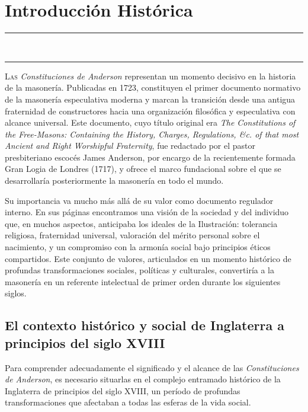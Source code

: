 \documentclass[a4paper,12pt,twoside]{book}
\newcommand{\ornline}{%
\begin{center}
\textcolor{dorado}{{\LARGE\rule{0.2\textwidth}{0.4pt}}~\scalebox{1.2}{❧}~\scalebox{1.2}{❧}~\scalebox{1.2}{❧}~
{\LARGE\rule{0.2\textwidth}{0.4pt}}}
\end{center}}
\begin{document}
\clearpage

\tableofcontents
\clearpage

\mainmatter

\chapter{Introducción Histórica}

\ornline
\vspace{1cm}

\lettrine[lines=3, lhang=0.1, loversize=0.1]{\textcolor{borgoña}{L}}{as} \textit{Constituciones de Anderson} representan un momento decisivo en la historia de la masonería. Publicadas en 1723, constituyen el primer documento normativo de la masonería especulativa moderna y marcan la transición desde una antigua fraternidad de constructores hacia una organización filosófica y especulativa con alcance universal. Este documento, cuyo título original era \textit{The Constitutions of the Free-Masons: Containing the History, Charges, Regulations, \&c. of that most Ancient and Right Worshipful Fraternity}, fue redactado por el pastor presbiteriano escocés James Anderson, por encargo de la recientemente formada Gran Logia de Londres (1717), y ofrece el marco fundacional sobre el que se desarrollaría posteriormente la masonería en todo el mundo.

Su importancia va mucho más allá de su valor como documento regulador interno. En sus páginas encontramos una visión de la sociedad y del individuo que, en muchos aspectos, anticipaba los ideales de la Ilustración: tolerancia religiosa, fraternidad universal, valoración del mérito personal sobre el nacimiento, y un compromiso con la armonía social bajo principios éticos compartidos. Este conjunto de valores, articulados en un momento histórico de profundas transformaciones sociales, políticas y culturales, convertiría a la masonería en un referente intelectual de primer orden durante los siguientes siglos.

\section{El contexto histórico y social de Inglaterra a principios del siglo XVIII}

Para comprender adecuadamente el significado y el alcance de las \textit{Constituciones de Anderson}, es necesario situarlas en el complejo entramado histórico de la Inglaterra de principios del siglo XVIII, un período de profundas transformaciones que afectaban a todas las esferas de la vida social.
\end{document}
